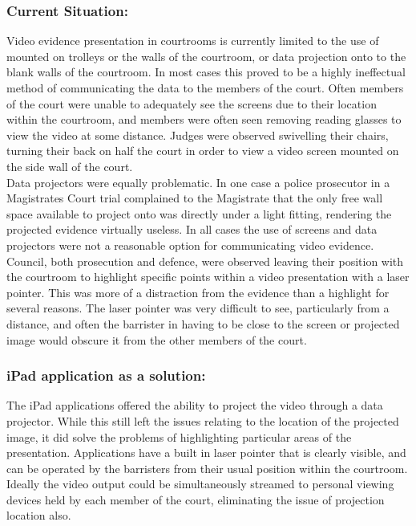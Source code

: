 \subsubsection{Current Situation:}
Video evidence presentation in courtrooms is currently limited to the use of  mounted on trolleys or the walls of the courtroom, or data projection onto to the blank walls of the courtroom. In most cases this proved to be a highly ineffectual method of communicating the data to the members of the court. Often members of the court were unable to adequately see the screens due to their location within the courtroom, and members were often  seen removing reading glasses to view the video at some distance. Judges were observed swivelling their chairs, turning their back on half the court in order to view a video screen mounted on the side wall of the court.\\
Data projectors were equally problematic. In one case a police prosecutor in a Magistrates Court trial complained to the Magistrate that the only free wall space available to project onto was directly under a light fitting, rendering the projected evidence virtually useless.
In all cases the use of screens and data projectors were not a reasonable option for communicating video evidence. \\
Council, both prosecution and defence, were observed leaving their position with the courtroom to highlight specific points within a video presentation with a laser pointer. This was more of a distraction from the evidence than a highlight for several reasons. The laser pointer was very difficult to see, particularly from a distance, and often the barrister in having to be close to the screen or projected image would obscure it from the other members of the court.\\
\subsubsection{iPad application as a solution:}
The iPad applications offered the ability to project the video through a data projector. While this still left the issues relating to the location of the projected image, it did solve the problems of highlighting particular areas of the presentation. Applications have a built in laser pointer that is clearly visible, and can be operated by the barristers from their usual position within the courtroom. Ideally the video output could be simultaneously streamed to personal viewing devices held by each member of the court, eliminating the issue of projection location also.\\
